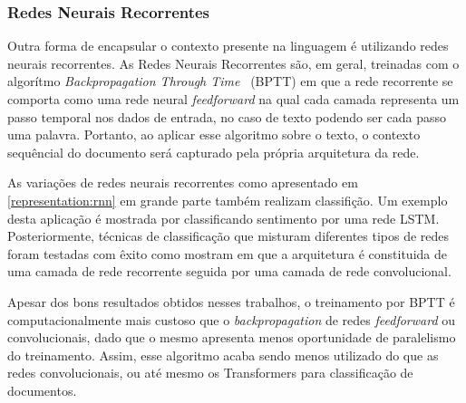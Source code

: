 \subsubsection{Redes Neurais Recorrentes}

Outra forma de encapsular o contexto presente na linguagem é utilizando redes
neurais recorrentes.
As Redes Neurais Recorrentes são, em geral, treinadas com o algorítmo
\textit{Backpropagation Through Time}~\cite{williams95} (BPTT) em que a rede
recorrente se comporta como uma rede neural \textit{feedforward} na qual cada
camada representa um passo temporal nos dados de entrada, no caso de texto
podendo ser cada passo uma palavra.
Portanto, ao aplicar esse algoritmo sobre o texto, o contexto sequêncial do
documento será capturado pela própria arquitetura da rede.

As variações de redes neurais recorrentes como apresentado em
\ref{representation:rnn} em grande parte também realizam classifição.
Um exemplo desta aplicação é mostrada por \citet{tai15} classificando sentimento
por uma rede LSTM.
Posteriormente, técnicas de classificação que misturam diferentes tipos de redes
foram testadas com êxito como mostram \citet{zhou16} em que a arquitetura é
constituida de uma camada de rede recorrente seguida por uma camada de rede
convolucional.

Apesar dos bons resultados obtidos nesses trabalhos, o treinamento por BPTT é
computacionalmente mais custoso que o \textit{backpropagation} de redes
\textit{feedforward} ou convolucionais, dado que o mesmo apresenta menos
oportunidade de paralelismo do treinamento.
Assim, esse algoritmo acaba sendo menos utilizado do que as redes
convolucionais, ou até mesmo os Transformers para classificação de documentos.

%
%
